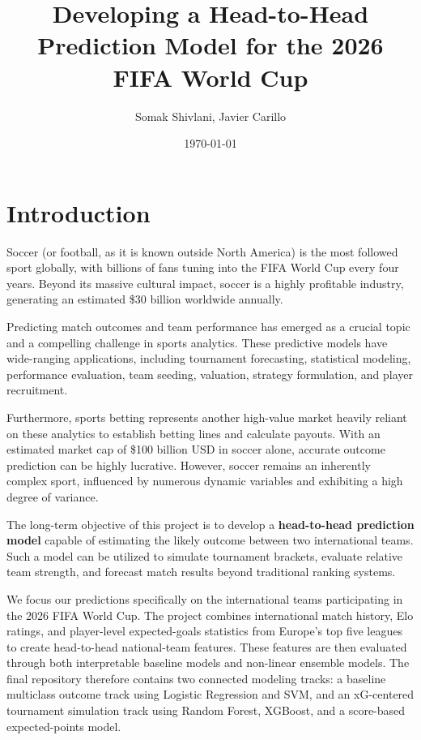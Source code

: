 \documentclass[11pt]{article}
\title{Developing a Head-to-Head Prediction Model for the 2026 FIFA World Cup}
\author{Somak Shivlani, Javier Carillo}
\date{\today}
\begin{document}
\maketitle

\section{Introduction}

Soccer (or football, as it is known outside North America) is the most followed sport globally, with billions of fans tuning into the FIFA World Cup every four years. Beyond its massive cultural impact, soccer is a highly profitable industry, generating an estimated \$30 billion worldwide annually.

Predicting match outcomes and team performance has emerged as a crucial topic and a compelling challenge in sports analytics. These predictive models have wide-ranging applications, including tournament forecasting, statistical modeling, performance evaluation, team seeding, valuation, strategy formulation, and player recruitment.

Furthermore, sports betting represents another high-value market heavily reliant on these analytics to establish betting lines and calculate payouts. With an estimated market cap of \$100 billion USD in soccer alone, accurate outcome prediction can be highly lucrative. However, soccer remains an inherently complex sport, influenced by numerous dynamic variables and exhibiting a high degree of variance.

The long-term objective of this project is to develop a\textbf{ head-to-head prediction model} capable of estimating the likely outcome between two international teams. Such a model can be utilized to simulate tournament brackets, evaluate relative team strength, and forecast match results beyond traditional ranking systems.

We focus our predictions specifically on the international teams participating in the 2026 FIFA World Cup. The project combines international match history, Elo ratings, and player-level expected-goals statistics from Europe's top five leagues to create head-to-head national-team features. These features are then evaluated through both interpretable baseline models and non-linear ensemble models. The final repository therefore contains two connected modeling tracks: a baseline multiclass outcome track using Logistic Regression and SVM, and an xG-centered tournament simulation track using Random Forest, XGBoost, and a score-based expected-points model.
\end{document}

